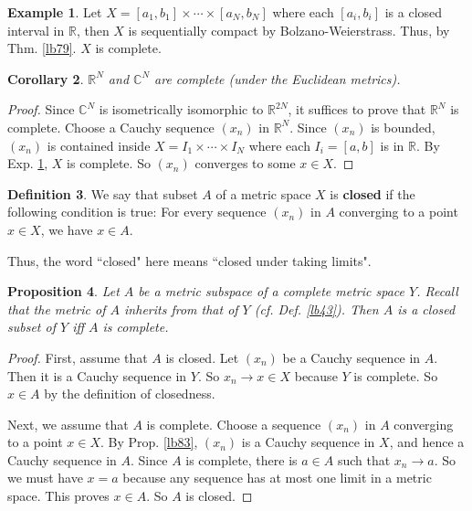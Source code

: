 \documentclass[12pt,b5paper,notitlepage]{article}
\theoremstyle{definition}
\newtheorem{df}{Definition}[section]
\newtheorem{eg}[df]{Example}
\theoremstyle{plain}
\newtheorem{pp}[df]{Proposition}
\newtheorem{co}[df]{Corollary}
\newcommand{\Cbb}{\mathbb C}
\newcommand{\Rbb}{\mathbb R}
\numberwithin{equation}{section}
\begin{document}
\begin{eg}\label{lb84}
Let  $X=[a_1,b_1]\times\cdots\times [a_N,b_N]$  where each $[a_i,b_i]$ is a closed interval in $\Rbb$, then $X$ is  sequentially compact by Bolzano-Weierstrass. Thus, by Thm. \ref{lb79}. $X$ is complete.
\end{eg}


\begin{co}\label{lb80}
$\Rbb^N$ and $\Cbb^N$ are complete (under the Euclidean metrics).
\end{co}

\begin{proof}
Since $\Cbb^N$ is isometrically isomorphic to $\Rbb^{2N}$, it suffices to prove that $\Rbb^N$ is complete. Choose a Cauchy sequence $(x_n)$ in $\Rbb^N$. Since $(x_n)$ is bounded, $(x_n)$ is contained inside $X=I_1\times\cdots\times I_N$ where each $I_i=[a,b]$ is in $\Rbb$. By Exp. \ref{lb84}, $X$ is complete. So $(x_n)$ converges to some $x\in X$.
\end{proof}





\begin{df}
We say that subset $A$ of a metric space $X$ is \textbf{closed}  if the following condition is true: For every sequence $(x_n)$ in $A$ converging to a point $x\in X$, we have $x\in A$.
\end{df}


Thus, the word ``closed" here means ``closed under taking limits".


\begin{pp}\label{lb86}
Let $A$ be a metric subspace of a complete metric space $Y$. Recall  that the metric of $A$ inherits from that of $Y$ (cf. Def. \ref{lb43}). Then $A$ is a closed subset of $Y$ iff $A$ is complete.
\end{pp}


\begin{proof}
First, assume that $A$ is closed. Let $(x_n)$ be a Cauchy sequence in $A$. Then it is a Cauchy sequence in $Y$. So $x_n\rightarrow x\in X$ because $Y$ is complete. So $x\in A$ by the definition of closedness.

Next, we assume that $A$ is complete. Choose a sequence $(x_n)$ in $A$ converging to a point $x\in X$. By Prop. \ref{lb83}, $(x_n)$ is a Cauchy sequence in $X$, and hence a Cauchy sequence in $A$. Since $A$ is complete, there is $a\in A$ such that $x_n\rightarrow a$. So we must have $x=a$ because any sequence has at most one limit in a metric space. This proves $x\in A$. So $A$ is closed.
\end{proof}
\end{document}
